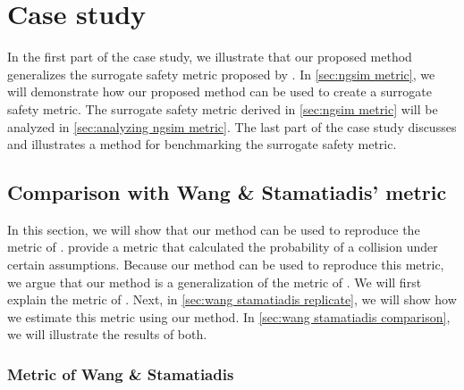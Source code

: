 \section{Case study}
\label{sec:case study}

In the first part of the case study, we illustrate that our proposed method generalizes the surrogate safety metric proposed by \textcite{wang2014evaluation}.
In \cref{sec:ngsim metric}, we will demonstrate how our proposed method can be used to create a surrogate safety metric.
The surrogate safety metric derived in \cref{sec:ngsim metric} will be analyzed in \cref{sec:analyzing ngsim metric}.
The last part of the case study discusses and illustrates a method for benchmarking the surrogate safety metric.



\subsection{Comparison with Wang \& Stamatiadis' metric}
\label{sec:wang stamatiadis}

In this section, we will show that our method can be used to reproduce the metric of \textcite{wang2014evaluation}.
\textcite{wang2014evaluation} provide a metric that calculated the probability of a collision under certain assumptions. 
Because our method can be used to reproduce this metric, we argue that our method is a generalization of the metric of \textcite{wang2014evaluation}.
We will first explain the metric of \textcite{wang2014evaluation}. 
Next, in \cref{sec:wang stamatiadis replicate}, we will show how we estimate this metric using our method.
In \cref{sec:wang stamatiadis comparison}, we will illustrate the results of both.



\subsubsection{Metric of Wang \& Stamatiadis}
\label{sec:wang stamatiadis explanation}

